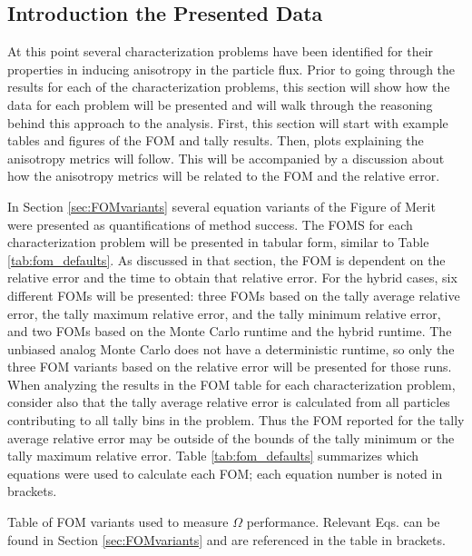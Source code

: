 \subsection{Introduction the Presented Data}
\label{subsec:resultsintro}

At this point several characterization problems have been identified for their
properties in inducing anisotropy in the particle flux.
Prior to going through the results for each of the characterization problems,
this section will show how the data for each problem will be presented and will
walk through the reasoning behind this approach to the analysis. First, this
section will start with example tables and figures of the FOM and tally results.
Then, plots explaining the anisotropy metrics will follow. This will be
accompanied by a
discussion about how the anisotropy metrics will be related to the FOM and the
relative error.

In Section \ref{sec:FOMvariants} several equation variants of
the Figure of Merit were
presented as quantifications of method success. The FOMS for each
characterization problem will be presented in tabular form, similar to Table
\ref{tab:fom_defaults}. As discussed in that section, the FOM is dependent on
the relative error and the time to obtain that relative error. For the hybrid
cases, six different FOMs will be presented: three FOMs based on the tally average
relative error, the tally maximum relative error, and the tally minimum relative
error, and two FOMs based on the Monte Carlo runtime and the hybrid runtime. The
unbiased analog Monte Carlo does not have a deterministic runtime, so only the
three FOM variants based on the relative error will be presented for those runs.
When analyzing the results in the FOM table for each characterization problem,
consider also that the tally average relative error is calculated from all
particles contributing to all tally bins in the problem. Thus the FOM reported
for the tally average relative error may be outside of the bounds of the tally
minimum or the tally maximum relative error.
Table \ref{tab:fom_defaults} summarizes which
equations were used to calculate each FOM; each equation number is noted
in brackets.

\begin{table}[h!]
  \centering
  
  \caption[Table of FOM variants used to measure $\Omega$ performance.]{
  Table of FOM variants used to measure $\Omega$ performance. Relevant Eqs. can
  be found in Section \ref{sec:FOMvariants} and are referenced in the table in
  brackets.}
  \label{tab:fom_defaults}
\end{table}

